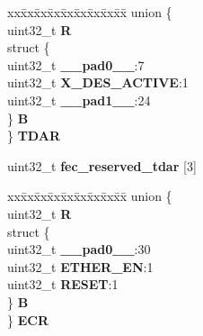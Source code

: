 \begin{DoxyCompactItemize}
\begin{tabbing}
\end{tabbing}\item 
\mbox{\label{structFEC__tag_a7e382bf44cf7d4b2274971d5830b6f15}} 
\begin{tabbing}
xx\=xx\=xx\=xx\=xx\=xx\=xx\=xx\=xx\=\kill
union \{\\
\>uint32\_t {\bfseries R}\\
\>struct \{\\
\>\>uint32\_t {\bfseries \_\_pad0\_\_}:7\\
\>\>uint32\_t {\bfseries X\_DES\_ACTIVE}:1\\
\>\>uint32\_t {\bfseries \_\_pad1\_\_}:24\\
\>\} {\bfseries B}\\
\} {\bfseries TDAR}\\

\end{tabbing}\item 
\mbox{\label{structFEC__tag_aea7a4e9e85734b8ffb1a10845cafca53}} 
uint32\+\_\+t {\bfseries fec\+\_\+reserved\+\_\+tdar} \mbox{[}3\mbox{]}
\item 
\mbox{\label{structFEC__tag_a112676923776733dfe508435705b8ce7}} 
\begin{tabbing}
xx\=xx\=xx\=xx\=xx\=xx\=xx\=xx\=xx\=\kill
union \{\\
\>uint32\_t {\bfseries R}\\
\>struct \{\\
\>\>uint32\_t {\bfseries \_\_pad0\_\_}:30\\
\>\>uint32\_t {\bfseries ETHER\_EN}:1\\
\>\>uint32\_t {\bfseries RESET}:1\\
\>\} {\bfseries B}\\
\} {\bfseries ECR}\\


\end{tabbing}
\end{DoxyCompactItemize}
